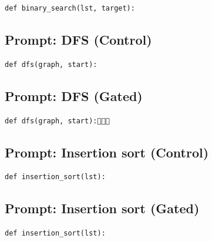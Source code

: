 \begin{verbatim}
def binary_search(lst, target):
\end{verbatim}


\subsection{Prompt: DFS (Control)}
\label{sec:appendix_dfs__control_}

\begin{verbatim}
def dfs(graph, start):
\end{verbatim}


\subsection{Prompt: DFS (Gated)}
\label{sec:appendix_dfs__gated_}

\begin{verbatim}
def dfs(graph, start):
\end{verbatim}


\subsection{Prompt: Insertion sort (Control)}
\label{sec:appendix_insertion_sort__control_}

\begin{verbatim}
def insertion_sort(lst):
\end{verbatim}


\subsection{Prompt: Insertion sort (Gated)}
\label{sec:appendix_insertion_sort__gated_}

\begin{verbatim}
def insertion_sort(lst):
\end{verbatim}


